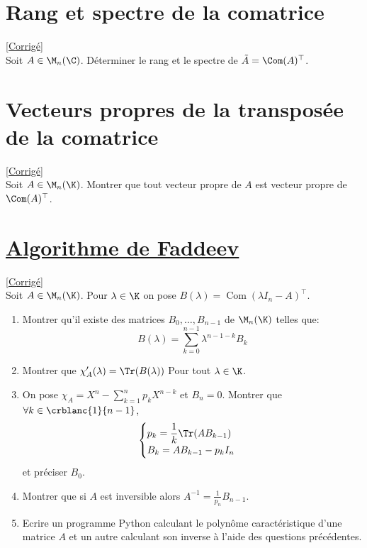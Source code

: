 \documentclass[8pt]{book}
\begin{document}
	\section{Rang et spectre de la comatrice }
	\label{Rang et spectre de la comatrice}
	\textcolor{blue}{\hyperref[Rang et spectre de la comatrice corrigé]{[Corrigé]}}\\
	Soit $A\in \M_n(\C)$. Déterminer le rang et le spectre de $\tilde A=\Com(A)^\top$.
	
	\section{Vecteurs propres de la transposée de la comatrice }
	\label{Vecteurs propres de la transposée de la comatrice}
	\textcolor{blue}{\hyperref[Vecteurs propres de la transposée de la comatrice corrigé]{[Corrigé]}}\\
	Soit $A\in \M_n(\K)$. Montrer que tout vecteur propre de $A$ est vecteur propre de $\Com(A)^\top$.
	
	\section{\underline{Algorithme de Faddeev} }
	\label{Algorithme de Faddeev}
	\textcolor{blue}{\hyperref[Algorithme de Faddeev corrigé]{[Corrigé]}}\\
	Soit $A\in \M_n(\K)$. Pour $\lambda \in \K$ on pose $B(\lambda)=\operatorname{Com}(\lambda I_n-A)^\top$.
	\begin{enumerate}[leftmargin=*]
		\item Montrer qu'il existe des matrices $B_0,\dots,B_{n-1}$ de $\M_n(\K)$ telles que:$$B(\lambda)=\sum\limits_{k=0}^{n-1}{\lambda^{n-1-k}B_k}$$
		\item Montrer que $\chi_A'(\lambda)=\Tr(B(\lambda))$ Pour tout $\lambda\in \K$.
		\item On pose $\chi_A=X^n-\displaystyle\sum\limits_{k=1}^n{p_kX^{n-k}}$ et $B_n=0$. Montrer que $\forall k\in \crblanc{1}{n-1}$,
		$$\begin{cases}
			p_k=\dfrac{1}{k}\Tr(AB_{k-1})\\
			B_k=AB_{k-1}-p_kI_n
		\end{cases}$$
		et préciser $B_0$.
		\item Montrer que si $A$ est inversible alors $A^{-1}=\displaystyle\frac{1}{p_n}B_{n-1}$.
		\item Ecrire un programme Python calculant le polynôme caractéristique d'une matrice $A$ et un autre calculant son inverse à l'aide des questions précédentes.
	\end{enumerate}
	
\end{document}
